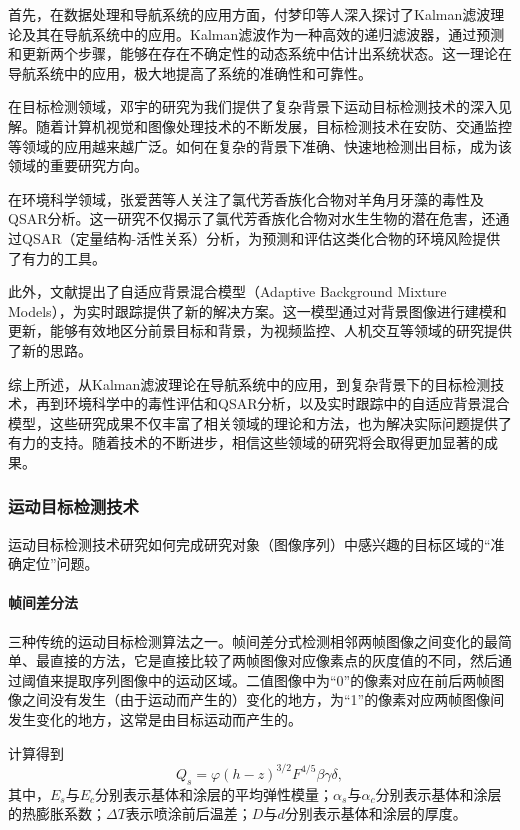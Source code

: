 首先，在数据处理和导航系统的应用方面，付梦印等人深入探讨了Kalman滤波理论及其在导航系统中的应用。Kalman滤波作为一种高效的递归滤波器，通过预测和更新两个步骤，能够在存在不确定性的动态系统中估计出系统状态。这一理论在导航系统中的应用，极大地提高了系统的准确性和可靠性。

在目标检测领域，邓宇的研究为我们提供了复杂背景下运动目标检测技术的深入见解。随着计算机视觉和图像处理技术的不断发展，目标检测技术在安防、交通监控等领域的应用越来越广泛。如何在复杂的背景下准确、快速地检测出目标，成为该领域的重要研究方向。

在环境科学领域，张爱茜等人关注了氯代芳香族化合物对羊角月牙藻的毒性及QSAR分析。这一研究不仅揭示了氯代芳香族化合物对水生生物的潜在危害，还通过QSAR（定量结构-活性关系）分析，为预测和评估这类化合物的环境风险提供了有力的工具。

此外，文献\cite{Stauffer1999}提出了自适应背景混合模型（Adaptive Background Mixture Models），为实时跟踪提供了新的解决方案。这一模型通过对背景图像进行建模和更新，能够有效地区分前景目标和背景，为视频监控、人机交互等领域的研究提供了新的思路。

综上所述，从Kalman滤波理论在导航系统中的应用，到复杂背景下的目标检测技术，再到环境科学中的毒性评估和QSAR分析，以及实时跟踪中的自适应背景混合模型，这些研究成果不仅丰富了相关领域的理论和方法，也为解决实际问题提供了有力的支持。随着技术的不断进步，相信这些领域的研究将会取得更加显著的成果。

\subsubsection{运动目标检测技术}

运动目标检测技术研究如何完成研究对象（图像序列）中感兴趣的目标区域的“准确定位”问题。

\paragraph{帧间差分法}

三种传统的运动目标检测算法之一。帧间差分式检测相邻两帧图像之间变化的最简单、最直接的方法，它是直接比较了两帧图像对应像素点的灰度值的不同，然后通过阈值来提取序列图像中的运动区域。二值图像中为“$0$”的像素对应在前后两帧图像之间没有发生（由于运动而产生的）变化的地方，为“1”的像素对应两帧图像间发生变化的地方，这常是由目标运动而产生的。

计算得到
\begin{equation}%
Q_s = \varphi(h-z)^{3/2}F^{4/5}\beta\gamma\delta,
\end{equation}
其中，$E_s$与$E_c$分别表示基体和涂层的平均弹性模量；$\alpha_s$与$\alpha_c$分别表示基体和涂层的热膨胀系数；$\Delta T$表示喷涂前后温差；$D$与$d$分别表示基体和涂层的厚度。

